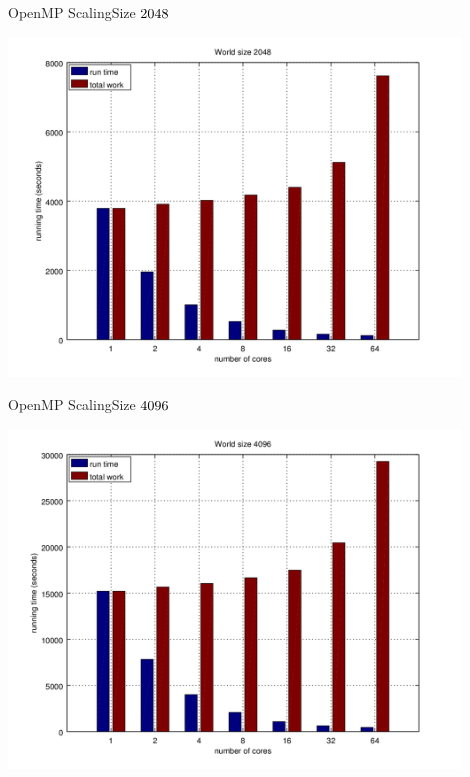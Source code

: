 \documentclass{beamer}
\begin{document}
\begin{frame}{OpenMP Scaling}{Size $2048 \time 2048$}
    \begin{center}
        \includegraphics[width=0.9\textwidth]{scaling-2048}
    \end{center}
\end{frame}

\begin{frame}{OpenMP Scaling}{Size $4096 \time 4096$}
    \begin{center}
        \includegraphics[width=0.9\textwidth]{scaling-4096}
    \end{center}
\end{frame}
\end{document}
